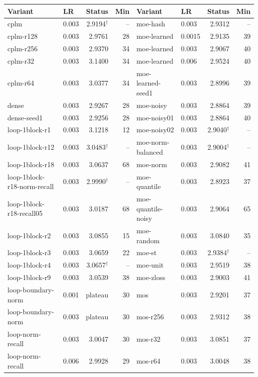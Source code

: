 \begin{center}\scriptsize\begin{tabular}{llrr @{\hspace{2em}} llrr}\toprule
Variant & LR & Status & Min & Variant & LR & Status & Min \\ \midrule
cplm & 0.003 & 2.9194$^\dagger$ & -- & moe-hash & 0.003 & 2.9312 & -- \\
cplm-r128 & 0.003 & 2.9761 & 28 & moe-learned & 0.0015 & 2.9135 & 39 \\
cplm-r256 & 0.003 & 2.9370 & 34 & moe-learned & 0.003 & 2.9067 & 40 \\
cplm-r32 & 0.003 & 3.1400 & 34 & moe-learned & 0.006 & 2.9524 & 40 \\
cplm-r64 & 0.003 & 3.0377 & 34 & moe-learned-seed1 & 0.003 & 2.8996 & 39 \\
dense & 0.003 & 2.9267 & 28 & moe-noisy & 0.003 & 2.8864 & 39 \\
dense-seed1 & 0.003 & 2.9256 & 28 & moe-noisy01 & 0.003 & 2.8864 & 40 \\
loop-1block-r1 & 0.003 & 3.1218 & 12 & moe-noisy02 & 0.003 & 2.9040$^\dagger$ & -- \\
loop-1block-r12 & 0.003 & 3.0483$^\dagger$ & -- & moe-norm-balanced & 0.003 & 2.9004$^\dagger$ & -- \\
loop-1block-r18 & 0.003 & 3.0637 & 68 & moe-norm & 0.003 & 2.9082 & 41 \\
loop-1block-r18-norm-recall & 0.003 & 2.9990$^\dagger$ & -- & moe-quantile & 0.003 & 2.8923 & 37 \\
loop-1block-r18-recall05 & 0.003 & 3.0187 & 68 & moe-quantile-noisy & 0.003 & 2.9064 & 65 \\
loop-1block-r2 & 0.003 & 3.0855 & 15 & moe-random & 0.003 & 3.0840 & 35 \\
loop-1block-r3 & 0.003 & 3.0659 & 22 & moe-st & 0.003 & 2.9384$^\dagger$ & -- \\
loop-1block-r4 & 0.003 & 3.0657$^\dagger$ & -- & moe-unit & 0.003 & 2.9519 & 38 \\
loop-1block-r9 & 0.003 & 3.0539 & 38 & moe-zloss & 0.003 & 2.9003 & 41 \\
loop-boundary-norm & 0.001 & plateau & 30 & mos & 0.003 & 2.9201 & 37 \\
loop-boundary-norm & 0.003 & plateau & 30 & mos-r256 & 0.003 & 2.9312 & 38 \\
loop-norm-recall & 0.003 & 3.0047 & 30 & mos-r32 & 0.003 & 3.0851 & 37 \\
loop-norm-recall & 0.006 & 2.9928 & 29 & mos-r64 & 0.003 & 3.0048 & 38 \\

\end{tabular}
\end{center}

